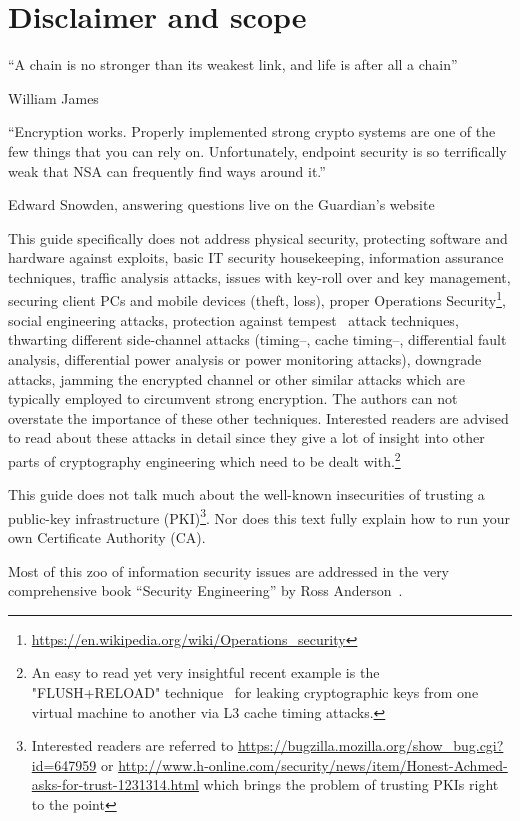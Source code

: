 \section{Disclaimer and scope}
\label{section:disclaimer}
\label{sec:disclaimer-scope}

\epigraph{``A chain is no stronger than its weakest link, and life is after all a chain''}{William James}
\epigraph{``Encryption works. Properly implemented strong crypto systems are
one of the few things that you can rely on. Unfortunately, endpoint security is
so terrifically weak that NSA can frequently find ways around it.''}{Edward
Snowden, answering questions live on the Guardian's
website~\cite{snowdenGuardianGreenwald}}


This guide specifically does not address physical security, protecting software
and hardware against exploits, basic IT security housekeeping, information
assurance techniques, traffic analysis attacks, issues with key-roll over and
key management, securing client PCs and mobile devices (theft, loss), proper
Operations Security\footnote{\url{https://en.wikipedia.org/wiki/Operations_security}}, social
engineering attacks, protection against tempest~\cite{Wikipedia:Tempest} attack techniques,
thwarting different side-channel attacks (timing--, cache timing--,
differential fault analysis, differential power analysis or power monitoring
attacks), downgrade attacks, jamming the encrypted channel or other similar
attacks which are typically employed to circumvent strong encryption.  The
authors can not overstate the importance of these other techniques.  Interested
readers are advised to read about these attacks in detail since they give a lot
of insight into other parts of cryptography engineering which need to be dealt
with.\footnote{An easy to read yet very insightful recent example is the
"FLUSH+RELOAD" technique~\cite{yarom2013flush+} for leaking cryptographic keys
from one virtual machine to another via L3 cache timing attacks.}

This guide does not talk much about the well-known insecurities of trusting a
public-key infrastructure (PKI)\footnote{Interested readers are referred to
\url{https://bugzilla.mozilla.org/show_bug.cgi?id=647959} or
\url{http://www.h-online.com/security/news/item/Honest-Achmed-asks-for-trust-1231314.html}
which brings the problem of trusting PKIs right to the point}. Nor
does this text fully explain how to run your own Certificate Authority (CA). 


Most of this zoo of information security issues are addressed in the very
comprehensive book ``Security Engineering'' by Ross Anderson~\cite{anderson2008security}. 


